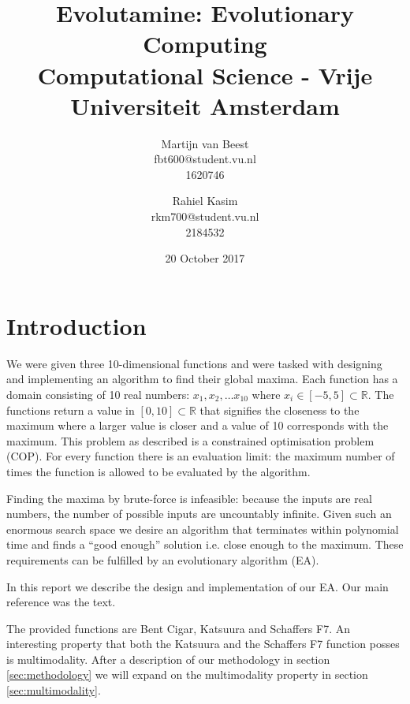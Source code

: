 



\title{Evolutamine: Evolutionary Computing\\
  \small Computational Science - Vrije Universiteit Amsterdam}

\author
{
    Martijn van Beest\\
    \small{fbt600@student.vu.nl}\\
    \small{1620746}
    \and
    Rahiel Kasim\\
    \small{rkm700@student.vu.nl}\\
    \small{2184532}
}
\date{20 October 2017}
\maketitle


\section{Introduction}
We were given three 10-dimensional functions and were tasked with designing and implementing an
algorithm to find their global maxima. Each function has a domain consisting of 10 real numbers:
$x_1, x_2, \ldots x_{10}$ where $x_i \in [-5, 5] \subset \mathbb{R}$. The functions return a value
in $[0, 10] \subset \mathbb{R}$ that signifies the closeness to the maximum where a larger value is
closer and a value of 10 corresponds with the maximum. This problem as described is a constrained
optimisation problem (COP). For every function there is an evaluation limit: the maximum number of
times the function is allowed to be evaluated by the algorithm.

Finding the maxima by brute-force is infeasible: because the inputs are real numbers, the number of
possible inputs are uncountably infinite. Given such an enormous search space we desire an algorithm
that terminates within polynomial time and finds a ``good enough'' solution i.e. close enough to the
maximum. These requirements can be fulfilled by an evolutionary algorithm (EA).

In this report we describe the design and implementation of our EA. Our main reference was the
text\book.

The provided functions are Bent Cigar, Katsuura and Schaffers F7. An interesting property that both
the Katsuura and the Schaffers F7 function posses is multimodality. After a description of our
methodology in section \ref{sec:methodology} we will expand on the multimodality property in section
\ref{sec:multimodality}.

